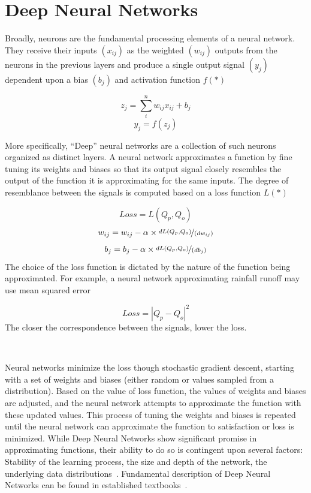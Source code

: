 
\section{Deep Neural Networks}\label{SI:neuralnets}
Broadly, neurons are the fundamental processing elements of a neural network.
They receive their inputs $(x_{ij})$ as the weighted $(w_{ij})$ outputs from the neurons in the previous layers and produce a single output signal $(y_j)$ dependent upon a bias $(b_j)$ and activation function $f(*)$

\begin{equation}
      z_j = \sum_i^n w_{ij}  x_{ij}+b_j
\end{equation}
\begin{equation}
    y_j = f(z_j)
\end{equation}

More specifically, “Deep” neural networks are a collection of such neurons organized as distinct layers.
A neural network approximates a function by fine tuning its weights and biases so that its output signal closely resembles the output of the function it is approximating for the same inputs.
The degree of resemblance between the signals is computed based on a loss function $L(*)$

\begin{equation}
    Loss = L(Q_p,Q_o)
\end{equation}
\begin{equation}
    w_{ij} = w_{ij}- \alpha \times  \nicefrac{dL(Q_p,Q_o )}{(dw_{ij})}
\end{equation}
\begin{equation}
    b_j = b_j- \alpha \times  \nicefrac{dL(Q_p,Q_o )}{(db_j)}
\end{equation}
The choice of the loss function is dictated by the nature of the function being approximated.
For example, a neural network approximating rainfall runoff may use mean squared error\cite{tokar1999rainfall}

\begin{equation}
    Loss = |Q_p-Q_o|^2
\end{equation}
The closer the correspondence between the signals, lower the loss.

\

Neural networks minimize the loss though stochastic gradient descent, starting with a set of weights and biases (either random or values sampled from a distribution).
Based on the value of loss function, the values of weights and biases are adjusted, and the neural network attempts to approximate the function with these updated values.
This process of tuning the weights and biases is repeated until the neural network can approximate the function to satisfaction or loss is minimized.
While Deep Neural Networks show significant promise in approximating functions, their ability to do so is contingent upon several factors: Stability of the learning process, the size and depth of the network, the underlying data distributions~\cite{goodfellow2016Deep,chollet2017Deep}.
Fundamental description of Deep Neural Networks can be found in established textbooks~\cite{goodfellow2016Deep}.


